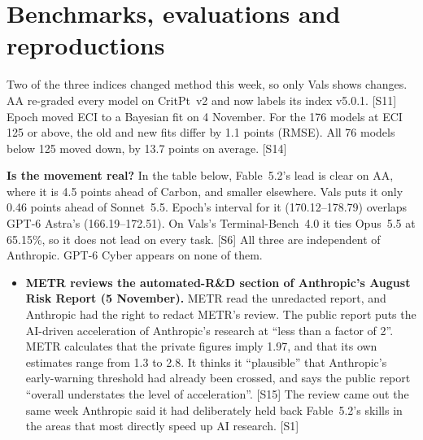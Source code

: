 \documentclass[11pt,a4paper]{article}
\newcommand{\srcref}[1]{\textcolor{brandaccent}{[S#1]}}
\begin{document}
\section{Benchmarks, evaluations and reproductions}

Two of the three indices changed method this week, so only Vals shows changes. AA re-graded every model on CritPt~v2 and now labels its index v5.0.1. \srcref{11}
Epoch moved ECI to a Bayesian fit on 4 November. For the 176 models at ECI 125 or above, the old and new fits differ by 1.1 points (RMSE). All 76 models below 125 moved down, by 13.7 points on average. \srcref{14}

\textbf{Is the movement real?} In the table below, Fable~5.2's lead is clear on AA, where it is 4.5 points ahead of Carbon, and smaller elsewhere. Vals puts it only 0.46 points ahead of Sonnet~5.5. Epoch's interval for it (170.12--178.79) overlaps GPT-6 Astra's (166.19--172.51).
On Vals's Terminal-Bench~4.0 it ties Opus~5.5 at 65.15\%, so it does not lead on every task. \srcref{6} All three are independent of Anthropic. GPT-6 Cyber appears on none of them.

\begin{itemize}
  \item \textbf{METR reviews the automated-R\&D section of Anthropic's August Risk Report (5 November).} METR read the unredacted report, and Anthropic had the right to redact METR's review. The public report puts the AI-driven acceleration of Anthropic's research at ``less than a factor of 2''.
  METR calculates that the private figures imply 1.97, and that its own estimates range from 1.3 to 2.8. It thinks it ``plausible'' that Anthropic's early-warning threshold had already been crossed, and says the public report ``overall understates the level of acceleration''. \srcref{15}
  The review came out the same week Anthropic said it had deliberately held back Fable~5.2's skills in the areas that most directly speed up AI research. \srcref{1}
\end{itemize}
\end{document}
